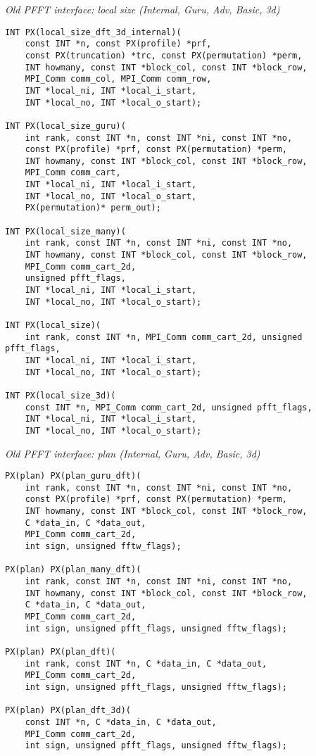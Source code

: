 \newpage
\emph{Old PFFT interface: local size (Internal, Guru, Adv, Basic, 3d)}
\begin{verbatim}
INT PX(local_size_dft_3d_internal)(
    const INT *n, const PX(profile) *prf,
    const PX(truncation) *trc, const PX(permutation) *perm,
    INT howmany, const INT *block_col, const INT *block_row,
    MPI_Comm comm_col, MPI_Comm comm_row,
    INT *local_ni, INT *local_i_start,
    INT *local_no, INT *local_o_start);

INT PX(local_size_guru)(
    int rank, const INT *n, const INT *ni, const INT *no,
    const PX(profile) *prf, const PX(permutation) *perm,
    INT howmany, const INT *block_col, const INT *block_row,
    MPI_Comm comm_cart,
    INT *local_ni, INT *local_i_start,
    INT *local_no, INT *local_o_start,
    PX(permutation)* perm_out);

INT PX(local_size_many)(
    int rank, const INT *n, const INT *ni, const INT *no,
    INT howmany, const INT *block_col, const INT *block_row,
    MPI_Comm comm_cart_2d,
    unsigned pfft_flags,
    INT *local_ni, INT *local_i_start,
    INT *local_no, INT *local_o_start);

INT PX(local_size)(
    int rank, const INT *n, MPI_Comm comm_cart_2d, unsigned pfft_flags,
    INT *local_ni, INT *local_i_start,
    INT *local_no, INT *local_o_start);

INT PX(local_size_3d)(
    const INT *n, MPI_Comm comm_cart_2d, unsigned pfft_flags,
    INT *local_ni, INT *local_i_start,
    INT *local_no, INT *local_o_start);
\end{verbatim}

\emph{Old PFFT interface: plan (Internal, Guru, Adv, Basic, 3d)}
\begin{verbatim}
PX(plan) PX(plan_guru_dft)(
    int rank, const INT *n, const INT *ni, const INT *no,
    const PX(profile) *prf, const PX(permutation) *perm,
    INT howmany, const INT *block_col, const INT *block_row,
    C *data_in, C *data_out,
    MPI_Comm comm_cart_2d,
    int sign, unsigned fftw_flags);

PX(plan) PX(plan_many_dft)(
    int rank, const INT *n, const INT *ni, const INT *no,
    INT howmany, const INT *block_col, const INT *block_row,
    C *data_in, C *data_out,
    MPI_Comm comm_cart_2d,
    int sign, unsigned pfft_flags, unsigned fftw_flags);

PX(plan) PX(plan_dft)(
    int rank, const INT *n, C *data_in, C *data_out,
    MPI_Comm comm_cart_2d,
    int sign, unsigned pfft_flags, unsigned fftw_flags);

PX(plan) PX(plan_dft_3d)(
    const INT *n, C *data_in, C *data_out,
    MPI_Comm comm_cart_2d,
    int sign, unsigned pfft_flags, unsigned fftw_flags);
\end{verbatim}


